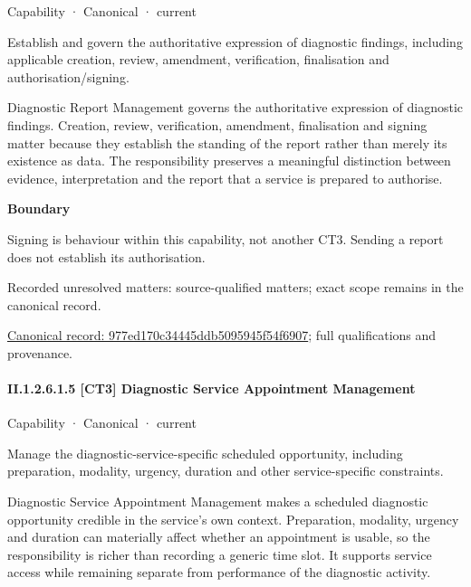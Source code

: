 \label{element:977ed170c34445ddb5095945f54f6907}
{\small Capability · Canonical · current}\par

Establish and govern the authoritative expression of diagnostic findings, including applicable creation, review, amendment, verification, finalisation and authorisation/signing.



Diagnostic Report Management governs the authoritative expression of diagnostic findings. Creation, review, verification, amendment, finalisation and signing matter because they establish the standing of the report rather than merely its existence as data. The responsibility preserves a meaningful distinction between evidence, interpretation and the report that a service is prepared to authorise.



\textbf{Boundary}



Signing is behaviour within this capability, not another CT3. Sending a report does not establish its authorisation.


{\small Recorded unresolved matters: source-qualified matters; exact scope remains in the canonical record.}\par
{\footnotesize \href{../../../../../../../continuum/strategy/capability/977ed170c34445ddb5095945f54f6907.md}{Canonical record: 977ed170c34445ddb5095945f54f6907}; full qualifications and provenance.}\par
\paragraph*{II.1.2.6.1.5 [CT3] Diagnostic Service Appointment Management}
\label{navigation:II.1.2.6.1.5}

\label{element:5410a0275dfa4460ad49100fa5a2f2ec}
{\small Capability · Canonical · current}\par

Manage the diagnostic-service-specific scheduled opportunity, including preparation, modality, urgency, duration and other service-specific constraints.



Diagnostic Service Appointment Management makes a scheduled diagnostic opportunity credible in the service's own context. Preparation, modality, urgency and duration can materially affect whether an appointment is usable, so the responsibility is richer than recording a generic time slot. It supports service access while remaining separate from performance of the diagnostic activity.



